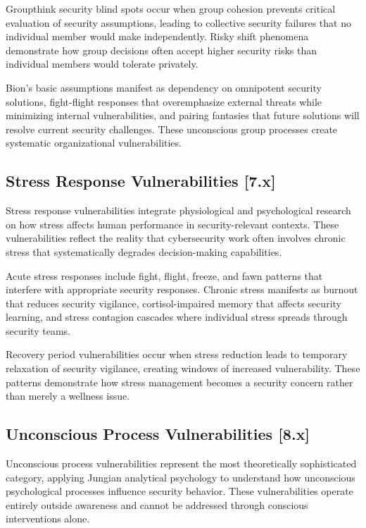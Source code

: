 \documentclass[11pt,a4paper]{article}
\begin{document}
Groupthink security blind spots occur when group cohesion prevents critical evaluation of security assumptions, leading to collective security failures that no individual member would make independently. Risky shift phenomena demonstrate how group decisions often accept higher security risks than individual members would tolerate privately.

Bion's basic assumptions manifest as dependency on omnipotent security solutions, fight-flight responses that overemphasize external threats while minimizing internal vulnerabilities, and pairing fantasies that future solutions will resolve current security challenges. These unconscious group processes create systematic organizational vulnerabilities.

\subsection{Stress Response Vulnerabilities [7.x]}

Stress response vulnerabilities integrate physiological and psychological research on how stress affects human performance in security-relevant contexts. These vulnerabilities reflect the reality that cybersecurity work often involves chronic stress that systematically degrades decision-making capabilities.

Acute stress responses include fight, flight, freeze, and fawn patterns that interfere with appropriate security responses. Chronic stress manifests as burnout that reduces security vigilance, cortisol-impaired memory that affects security learning, and stress contagion cascades where individual stress spreads through security teams.

Recovery period vulnerabilities occur when stress reduction leads to temporary relaxation of security vigilance, creating windows of increased vulnerability. These patterns demonstrate how stress management becomes a security concern rather than merely a wellness issue.

\subsection{Unconscious Process Vulnerabilities [8.x]}

Unconscious process vulnerabilities represent the most theoretically sophisticated category, applying Jungian analytical psychology to understand how unconscious psychological processes influence security behavior. These vulnerabilities operate entirely outside awareness and cannot be addressed through conscious interventions alone.
\end{document}

